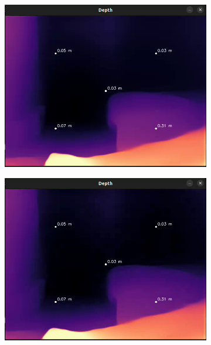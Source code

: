 \begin{figure}[H]
    \centering
    \begin{subfigure}[b]{0.45\textwidth}
        \includegraphics[width=\textwidth]{images/filter_a025/frame_00000.png}
    \end{subfigure}
    \hfill
    \begin{subfigure}[b]{0.45\textwidth}
        \includegraphics[width=\textwidth]{images/filter_a025/frame_00008.png}
    \end{subfigure}
    \vspace{0.5cm}
    \begin{subfigure}[b]{0.45\textwidth}

\end{subfigure}
\end{figure}
